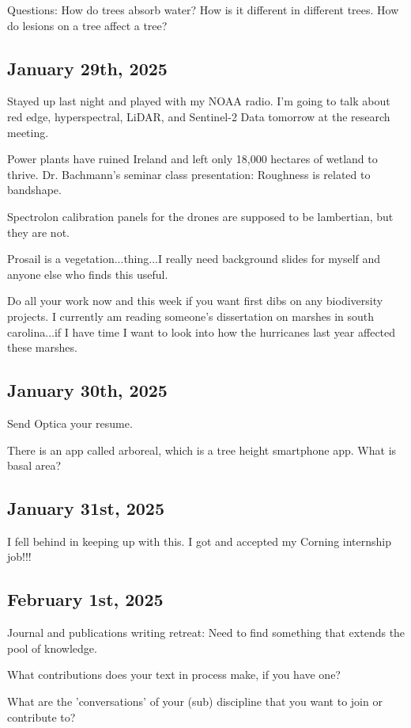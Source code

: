\documentclass{article}
\begin{document}
Questions: How do trees absorb water? How is it different in different trees. How do lesions on a tree affect a tree?

\subsection{January 29th, 2025}
Stayed up last night and played with my NOAA radio. I'm going to talk about red edge, hyperspectral, LiDAR, and Sentinel-2 Data tomorrow at the research meeting. 

Power plants have ruined Ireland and left only 18,000 hectares of wetland to thrive. 
Dr. Bachmann's seminar class presentation: 
Roughness is related to bandshape. 

Spectrolon calibration panels for the drones are supposed to be lambertian, but they are not. 

Prosail is a vegetation...thing...I really need background slides for myself and anyone else who finds this useful. 

Do all your work now and this week if you want first dibs on any biodiversity projects. I currently am reading someone's dissertation on marshes in south carolina...if I have time I want to look into how the hurricanes last year affected these marshes. 

\subsection{January 30th, 2025}
Send Optica your resume. 

There is an app called arboreal, which is a tree height smartphone app. 
What is basal area?

\subsection{January 31st, 2025}
I fell behind in keeping up with this. 
I got and accepted my Corning internship job!!!

\subsection{February 1st, 2025}
Journal and publications writing retreat: 
Need to find something that extends the pool of knowledge. 

What contributions does your text in process make, if you have one? 

What are the 'conversations' of your (sub) discipline that you want to join or contribute to? 
\end{document}
